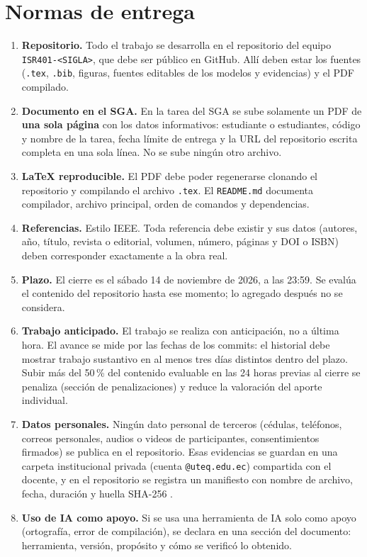 \documentclass[11pt]{article}
\newcommand{\seccion}[1]{\section{\textcolor{utegreendk}{#1}}}
\begin{document}
\seccion{Normas de entrega}

\begin{enumerate}[leftmargin=20pt,itemsep=3pt]
	\item \textbf{Repositorio.} Todo el trabajo se desarrolla en el repositorio del equipo \texttt{ISR401-<SIGLA>}, que debe ser público en GitHub. Allí deben estar los fuentes (\texttt{.tex}, \texttt{.bib}, figuras, fuentes editables de los modelos y evidencias) y el PDF compilado.
	\item \textbf{Documento en el SGA.} En la tarea del SGA se sube solamente un PDF de \textbf{una sola página} con los datos informativos: estudiante o estudiantes, código y nombre de la tarea, fecha límite de entrega y la URL del repositorio escrita completa en una sola línea. No se sube ningún otro archivo.
	\item \textbf{\LaTeX{} reproducible.} El PDF debe poder regenerarse clonando el repositorio y compilando el archivo \texttt{.tex}. El \texttt{README.md} documenta compilador, archivo principal, orden de comandos y dependencias.
	\item \textbf{Referencias.} Estilo IEEE. Toda referencia debe existir y sus datos (autores, año, título, revista o editorial, volumen, número, páginas y DOI o ISBN) deben corresponder exactamente a la obra real.
	\item \textbf{Plazo.} El cierre es el sábado 14 de noviembre de 2026, a las 23:59. Se evalúa el contenido del repositorio hasta ese momento; lo agregado después no se considera.
	\item \textbf{Trabajo anticipado.} El trabajo se realiza con anticipación, no a última hora. El avance se mide por las fechas de los commits: el historial debe mostrar trabajo sustantivo en al menos tres días distintos dentro del plazo. Subir más del 50\,\% del contenido evaluable en las 24 horas previas al cierre se penaliza (sección de penalizaciones) y reduce la valoración del aporte individual.
	\item \textbf{Datos personales.} Ningún dato personal de terceros (cédulas, teléfonos, correos personales, audios o videos de participantes, consentimientos firmados) se publica en el repositorio. Esas evidencias se guardan en una carpeta institucional privada (cuenta \texttt{@uteq.edu.ec}) compartida con el docente, y en el repositorio se registra un manifiesto con nombre de archivo, fecha, duración y huella SHA-256 \citep{lopdp_2021}.
	\item \textbf{Uso de IA como apoyo.} Si se usa una herramienta de IA solo como apoyo (ortografía, error de compilación), se declara en una sección del documento: herramienta, versión, propósito y cómo se verificó lo obtenido.
\end{enumerate}
\end{document}

